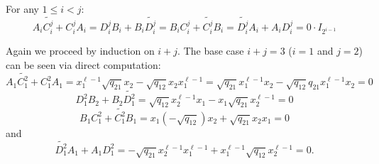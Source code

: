 \documentclass [11pt, proquest] {uwthesis}[2020/02/24]
\begin{document}
    \begin{lem}\label{lem:zero-matrix}
            For any $1\le i<j$:
            \[A_i\widetilde{C_i^j}+C_i^jA_{i} = D_i^jB_{i}+B_{i}\widetilde{D_i^j}=B_{i}C_{i}^j+\widetilde{C_i^j}B_i = \widetilde{D_i^j}A_i + A_iD_i^j=0\cdot I_{2^{i-1}}\]
    \end{lem}
    \begin{prf}
        Again we proceed by induction on $i+j.$ The base case $i+j=3$ ($i=1$ and $j=2$) can be seen via direct computation:
        \[A_1\widetilde{C_1^2}+C_1^2 A_1=x_1^{\ell-1}\sqrt{q_{21}}x_2-\sqrt{q_{12}}x_2x_1^{\ell-1}=\sqrt{q_{21}}x_1^{\ell-1}x_2-\sqrt{q_{12}}q_{21}x_1^{\ell-1}x_2=0\]
        \[D_1^2B_2+B_2\widetilde{D_1^2}=\sqrt{q_{12}}x_2^{\ell-1}x_1 - x_1\sqrt{q_{21}}x_2^{\ell-1}=0\]
        \[B_1C_1^2+\widetilde{C_1^2}B_1=x_1(-\sqrt{q_{12}})x_2+\sqrt{q_{21}}x_2x_1=0\]
        and
        \[\widetilde{D_1^2}A_1+A_1D_1^2=-\sqrt{q_{21}}x_2^{\ell-1}x_1^{\ell-1}+x_1^{\ell-1}\sqrt{q_{12}}x_2^{\ell-1}=0.\]
        

\end{prf}
\end{document}
